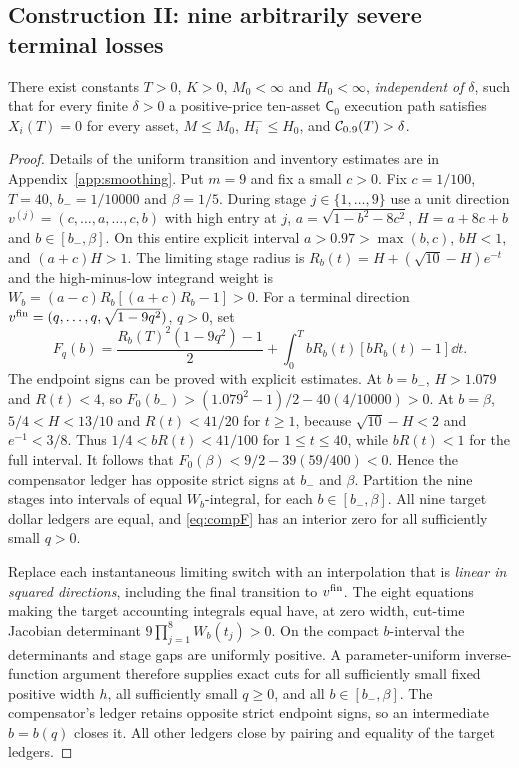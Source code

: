 \documentclass[review,hidelinks,onefignum,onetabnum]{siamonline250211}%
\begin{document}
\subsection{Construction II: nine arbitrarily severe terminal losses}
\label{sec:conII}
\begin{theorem}\label{thm:nine}
There exist constants $T>0$, $K>0$, $M_0<\infty$ and
$H_0<\infty$, \emph{independent of} $\delta$, such that for
every finite $\delta>0$ a positive-price ten-asset $\mathsf C_0$
execution path satisfies $X_i(T)=0$ for every asset,
$M\le M_0$, $H_i^-\le H_0$, and
$\mathcal{C}_{0.9}(T)>\delta$.
\end{theorem}
\begin{proof}
Details of the uniform transition and inventory estimates are in
Appendix~\ref{app:smoothing}. Put $m=9$ and fix a small $c>0$.
Fix $c=1/100$, $T=40$, $b_-=1/10000$ and $\beta=1/5$.
During stage $j\in\{1,\ldots,9\}$ use a unit direction
$v^{(j)}=(c,\ldots,a,\ldots,c,b)$ with high entry at $j$,
$a=\sqrt{1-b^2-8c^2}$, $H=a+8c+b$ and
$b\in[b_-,\beta]$. On this entire explicit interval
$a>0.97>\max(b,c)$, $bH<1$, and $(a+c)H>1$. The limiting stage radius is
$R_b(t)=H+(\sqrt{10}-H)e^{-t}$ and the high-minus-low
integrand weight is
$W_b=(a-c)R_b[(a+c)R_b-1]>0$.
For a terminal direction
$v^{\rm fin}=(q,\ldots,q,\sqrt{1-9q^2})$, $q>0$, set
\begin{equation}\label{eq:compF}
 F_q(b)=\frac{R_b(T)^2(1-9q^2)-1}{2}
  +\int_0^T bR_b(t)[bR_b(t)-1]\dd t.
\end{equation}
The endpoint signs can be proved with explicit estimates. At
$b=b_-$, $H>1.079$ and $R(t)<4$, so
$F_0(b_-)>(1.079^2-1)/2-40(4/10000)>0$.
At $b=\beta$, $5/4<H<13/10$ and
$R(t)<41/20$ for $t\ge1$, because
$\sqrt{10}-H<2$ and $e^{-1}<3/8$. Thus
$1/4<bR(t)<41/100$ for $1\le t\le40$, while
$bR(t)<1$ for the full interval. It follows that
$F_0(\beta)<9/2-39(59/400)<0$. Hence the
compensator ledger has opposite strict signs at $b_-$ and $\beta$. Partition the nine stages into
intervals of equal $W_b$-integral, for each $b\in[b_-,\beta]$.
All nine target dollar ledgers are equal, and \eqref{eq:compF}
has an interior zero for all sufficiently small $q>0$.

Replace each instantaneous limiting switch with an interpolation
that is \emph{linear in squared directions}, including the final
transition to $v^{\rm fin}$. The eight equations making the target
accounting integrals equal have, at zero width, cut-time Jacobian
determinant $9\prod_{j=1}^8 W_b(t_j)>0$.
On the compact $b$-interval the determinants and stage gaps are
uniformly positive. A parameter-uniform inverse-function argument
therefore supplies exact cuts for all sufficiently small fixed
positive width $h$, all sufficiently small $q\ge0$, and all
$b\in[b_-,\beta]$. The compensator's ledger retains opposite
strict endpoint signs, so an intermediate $b=b(q)$ closes it.
All other ledgers close by pairing and equality of the target ledgers.


\end{proof}
\end{document}
